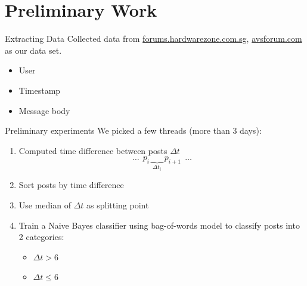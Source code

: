 \documentclass[compress]{beamer}
\begin{document}


\section{Preliminary Work}
\begin{frame}{Extracting Data}
	Collected data from \url{forums.hardwarezone.com.sg}, \url{avsforum.com} as our data set.
	\begin{itemize}
		\item User
		\item Timestamp
		\item Message body
	\end{itemize}
\end{frame}


\begin{frame}{Preliminary experiments}
We picked a few threads (more than 3 days):
\begin{enumerate}
	\item Computed time difference between posts $\Delta t$
		\[
			\hdots~~p_i\underbrace{~~~~~~~~}_{\Delta t_i} p_{i+1}~~\hdots
		\]
	\item Sort posts by time difference
	\item Use median of $\Delta t$ as splitting point
	\item Train a Naive Bayes classifier using bag-of-words model to classify posts into 2 categories:
	\begin{itemize}
		\item $\Delta t > 6$
		\item $\Delta t \leq 6$
	\end{itemize}
\end{enumerate}
\end{frame}
\end{document}
